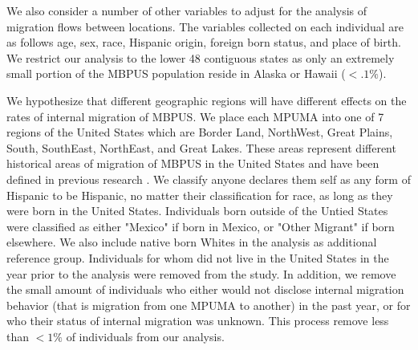 \documentclass[fleqn,12pt]{olplainarticle}
\begin{document}
We also consider a number of other variables to adjust for the analysis of migration flows between locations. The variables collected on each individual are as follows age, sex, race, Hispanic origin, foreign born status, and place of birth. We restrict our analysis to the lower 48 contiguous states as only an extremely small portion of the MBPUS population reside in Alaska or Hawaii ($<.1\%$).

We hypothesize that different geographic regions will have different effects on the rates of internal migration of MBPUS. We place each MPUMA into one of 7 regions of the United States which are Border Land, NorthWest, Great Plains, South, SouthEast, NorthEast, and Great Lakes. These areas represent different historical areas of migration of MBPUS in the United States and have been defined in previous research  \citep{ Riosmena2012}.  We classify anyone declares them self as any form of Hispanic to be Hispanic, no matter their classification for race, as long as they were born in the United States. Individuals born outside of the Untied States were classified as either "Mexico" if born in Mexico, or "Other Migrant" if born elsewhere. We also include native born Whites in the analysis as additional reference group. Individuals for whom did not live in the United States in the year prior to the analysis were removed from the study. In addition, we remove the small amount of individuals who either would not disclose internal migration behavior (that is migration from one MPUMA to another) in the past year, or for who their status of internal migration was unknown. This process remove less than $<1\%$ of individuals from our analysis.
\end{document}
